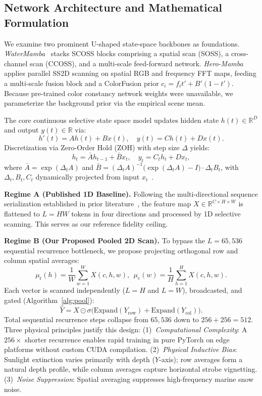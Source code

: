 \documentclass[conference]{IEEEtran}
\begin{document}
	\subsection{Network Architecture and Mathematical Formulation}
	We examine two prominent U-shaped state-space backbones as foundations. \emph{WaterMamba}~\cite{wm} stacks SCOSS blocks comprising a spatial scan (SOSS), a cross-channel scan (CCOSS), and a multi-scale feed-forward network. \emph{Hero-Mamba}~\cite{hm} applies parallel SS2D scanning on spatial RGB and frequency FFT maps, feeding a multi-scale fusion block and a ColorFusion prior $c_i=f_i t' + B'(1-t')$. Because pre-trained color constancy network weights were unavailable, we parameterize the background prior via the empirical scene mean.
	
	The core continuous selective state space model updates hidden state $h(t)\in\mathbb{R}^D$ and output $y(t)\in\mathbb{R}$ via:
	\begin{equation}
		h'(t) = A h(t) + B x(t), \quad y(t) = C h(t) + D x(t).
	\end{equation}
	Discretization via Zero-Order Hold (ZOH) with step size $\Delta$ yields:
	\begin{equation}
		h_t = \bar{A} h_{t-1} + \bar{B} x_t, \quad y_t = C_t h_t + D x_t,
	\end{equation}
	where $\bar{A} = \exp(\Delta_t A)$ and $\bar{B} = (\Delta_t A)^{-1}\bigl(\exp(\Delta_t A) - I\bigr)\cdot\Delta_t B_t$, with $\Delta_t, B_t, C_t$ dynamically projected from input $x_t$~\cite{mamba}.
	
	\textbf{Regime A (Published 1D Baseline).} Following the multi-directional sequence serialization established in prior literature~\cite{wm,hm}, the feature map $X\in\mathbb{R}^{C\times H\times W}$ is flattened to $L=HW$ tokens in four directions and processed by 1D selective scanning. This serves as our reference fidelity ceiling.
	
	\textbf{Regime B (Our Proposed Pooled 2D Scan).} To bypass the $L=65{,}536$ sequential recurrence bottleneck, we propose projecting orthogonal row and column spatial averages:
	\begin{equation}
		\mu_{\mathrm{r}}(h) = \frac{1}{W}\sum_{w=1}^W X(c,h,w), \ \ \mu_{\mathrm{c}}(w) = \frac{1}{H}\sum_{h=1}^H X(c,h,w).
	\end{equation}
	Each vector is scanned independently ($L=H$ and $L=W$), broadcasted, and gated (Algorithm~\ref{alg:pool}):
	\begin{equation}
		\hat Y = X \odot \sigma\bigl(\mathrm{Expand}(Y_{\text{row}}) + \mathrm{Expand}(Y_{\text{col}})\bigr).
	\end{equation}
	Total sequential recurrence steps collapse from $65{,}536$ down to $256 + 256 = 512$. Three physical principles justify this design: (1)~\emph{Computational Complexity}: A $256\times$ shorter recurrence enables rapid training in pure PyTorch on edge platforms without custom CUDA compilation. (2)~\emph{Physical Inductive Bias}: Sunlight extinction varies primarily with depth ($Y$-axis); row averages form a natural depth profile, while column averages capture horizontal strobe vignetting. (3)~\emph{Noise Suppression}: Spatial averaging suppresses high-frequency marine snow noise.
	
\end{document}

